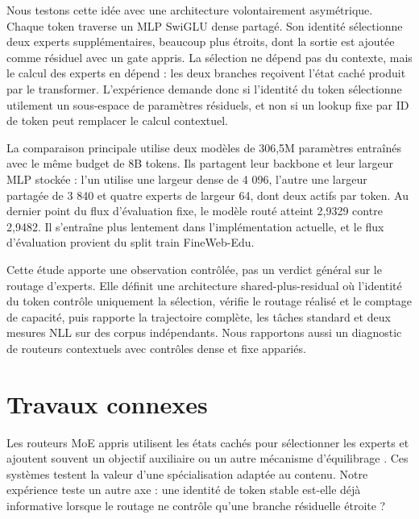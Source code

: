 \documentclass[10pt]{article}
\theoremstyle{definition}
\theoremstyle{remark}
\begin{document}
Nous testons cette id\'{e}e avec une architecture volontairement asym\'{e}trique. Chaque token traverse un MLP SwiGLU dense partag\'{e}. Son identit\'{e} s\'{e}lectionne deux experts suppl\'{e}mentaires, beaucoup plus \'{e}troits, dont la sortie est ajout\'{e}e comme r\'{e}siduel avec un gate appris. La s\'{e}lection ne d\'{e}pend pas du contexte, mais le calcul des experts en d\'{e}pend : les deux branches re\c{c}oivent l'\'{e}tat cach\'{e} produit par le transformer. L'exp\'{e}rience demande donc si l'identit\'{e} du token s\'{e}lectionne utilement un sous-espace de param\`{e}tres r\'{e}siduels, et non si un lookup fixe par ID de token peut remplacer le calcul contextuel.

La comparaison principale utilise deux mod\`{e}les de 306,5M param\`{e}tres entra\^{i}n\'{e}s avec le m\^{e}me budget de 8B tokens. Ils partagent leur backbone et leur largeur MLP stock\'{e}e : l'un utilise une largeur dense de 4 096, l'autre une largeur partag\'{e}e de 3 840 et quatre experts de largeur 64, dont deux actifs par token. Au dernier point du flux d'\'{e}valuation fixe, le mod\`{e}le rout\'{e} atteint 2,9329 contre 2,9482. Il s'entra\^{i}ne plus lentement dans l'impl\'{e}mentation actuelle, et le flux d'\'{e}valuation provient du split train FineWeb-Edu.

Cette \'{e}tude apporte une observation contr\^{o}l\'{e}e, pas un verdict g\'{e}n\'{e}ral sur le routage d'experts. Elle d\'{e}finit une architecture shared-plus-residual o\`{u} l'identit\'{e} du token contr\^{o}le uniquement la s\'{e}lection, v\'{e}rifie le routage r\'{e}alis\'{e} et le comptage de capacit\'{e}, puis rapporte la trajectoire compl\`{e}te, les t\^{a}ches standard et deux mesures NLL sur des corpus ind\'{e}pendants. Nous rapportons aussi un diagnostic de routeurs contextuels avec contr\^{o}les dense et fixe appari\'{e}s.

\section{Travaux connexes}
\label{sec:related_work}

Les routeurs MoE appris utilisent les \'{e}tats cach\'{e}s pour s\'{e}lectionner les experts et ajoutent souvent un objectif auxiliaire ou un autre m\'{e}canisme d'\'{e}quilibrage \citep{shazeer2017outrageously,fedus2022switch,jiang2024mixtral}. Ces syst\`{e}mes testent la valeur d'une sp\'{e}cialisation adapt\'{e}e au contenu. Notre exp\'{e}rience teste un autre axe : une identit\'{e} de token stable est-elle d\'{e}j\`{a} informative lorsque le routage ne contr\^{o}le qu'une branche r\'{e}siduelle \'{e}troite ?
\end{document}
